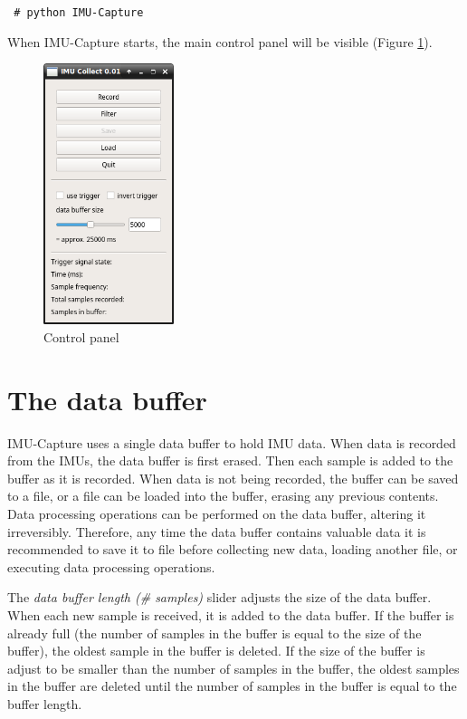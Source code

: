 \documentclass[11pt,letterpaper,article,oneside]{memoir}
\newcommand{\name}{IMU-Capture}
\begin{document}
\texttt{
\# python \name{}
}

When \name{} starts, the main control panel will be visible (Figure
\ref{fig:control}).

\begin{figure}[]
    \begin{center}
        \includegraphics[height=3in]{screenshot_panel}
    \end{center}
    \caption{Control panel} 
    \label{fig:control}
\end{figure}


\chapter{The data buffer} \name{} uses a single data buffer to hold IMU data.
When data is recorded from the IMUs, the data buffer is first erased. Then each
sample is added to the buffer as it is recorded. When data is not being
recorded, the buffer can be saved to a file, or a file can be loaded into the
buffer, erasing any previous contents. Data processing operations can be
performed on the data buffer, altering it irreversibly.  Therefore, any time the
data buffer contains valuable data it is recommended to save it to file before
collecting new data, loading another file, or executing data processing
operations.

The \emph{data buffer length (\# samples)} slider adjusts the size of the data
buffer. When each new sample is received, it is added to the data buffer. If the
buffer is already full (the number of samples in the buffer is equal to the
size of the buffer), the oldest sample in the buffer is deleted. If the size of
the buffer is adjust to be smaller than the number of samples in the buffer, the
oldest samples in the buffer are deleted until the number of samples in the
buffer is equal to the buffer length.
\end{document}
